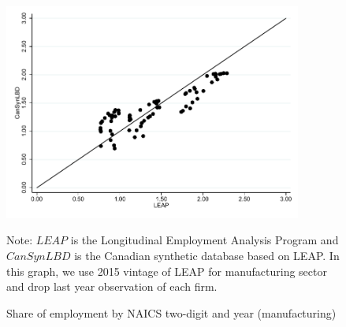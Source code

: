 \documentclass{article}
\begin{document}
\begin{figure} [H]
\centering
\caption{Share of employment by NAICS two-digit and year (manufacturing)} \label{EmploymentShareManufacturing}
\includegraphics[height=2.8in, width=.7\linewidth]{graphs/Share_of_employment_by_NAICS_two-digit_and_year_Manufacturing_bw.pdf} 
\begin{minipage}{0.85\textwidth}
{\footnotesize Note: $LEAP$ is the Longitudinal Employment Analysis Program and $CanSynLBD$ is the Canadian synthetic database based on LEAP. In this graph, we use 2015 vintage of LEAP for manufacturing sector and drop last year observation of each firm. \par}
\end{minipage}
\end{figure}
\end{document}
